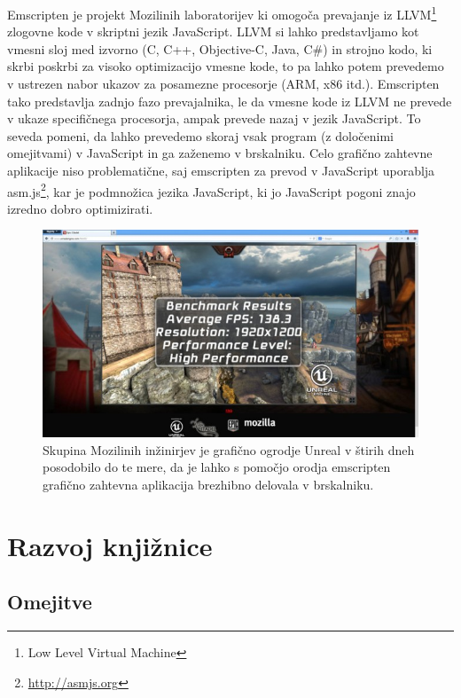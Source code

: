 Emscripten je projekt Mozilinih laboratorijev ki omogoča prevajanje iz LLVM\footnote{Low Level Virtual Machine} zlogovne kode v skriptni jezik JavaScript. LLVM si lahko predstavljamo kot vmesni sloj med izvorno (C, C++, Objective-C, Java, C\#) in strojno kodo, ki skrbi poskrbi za visoko optimizacijo vmesne kode, to pa lahko potem prevedemo v ustrezen nabor ukazov za posamezne procesorje (ARM, x86 itd.). Emscripten tako predstavlja zadnjo fazo prevajalnika, le da vmesne kode iz LLVM ne prevede v ukaze specifičnega procesorja, ampak prevede nazaj v jezik JavaScript. To seveda pomeni, da lahko prevedemo skoraj vsak program (z določenimi omejitvami) v JavaScript in ga zaženemo v brskalniku. Celo grafično zahtevne aplikacije niso problematične, saj emscripten za prevod v JavaScript uporablja asm.js\footnote{\href{http://asmjs.org}{http://asmjs.org}}, kar je podmnožica jezika JavaScript, ki jo JavaScript pogoni znajo izredno dobro optimizirati.

\begin{figure}
 \includegraphics[width=\linewidth]{emscripten-epic-citadel}
 \caption{Skupina Mozilinih inžinirjev je grafično ogrodje Unreal v štirih dneh posodobilo do te mere, da je lahko s pomočjo orodja emscripten grafično zahtevna aplikacija brezhibno delovala v brskalniku.}
 \label{fig:epic-citadel}
\end{figure}

\chapter{Razvoj knjižnice}
\label{chap:development}

\section{Omejitve}

